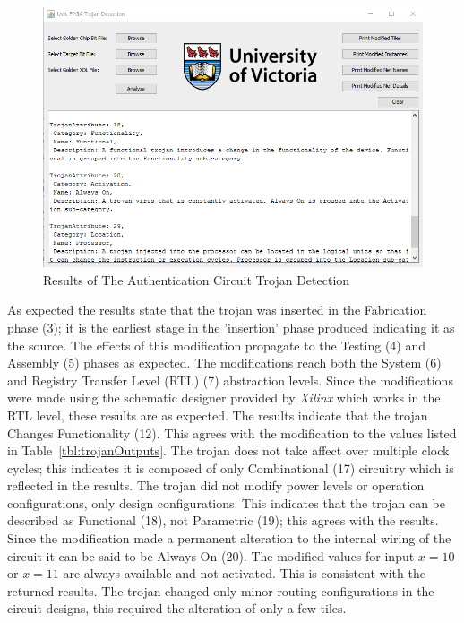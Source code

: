 \documentclass[journal, hidelinks]{IEEEtran}
\begin{document}
\begin{figure}[h]
	\centering
	\includegraphics[width=1\linewidth]{Figures/backDoorResult}
	\caption[Results of The Authentication Circuit Trojan Detection]{Results of The Authentication Circuit Trojan Detection}
	\label{fig:backDoorResult}
\end{figure}
As expected the results state that the trojan was inserted in the Fabrication phase (3); it is the earliest stage in the 'insertion' phase produced indicating it as the source.
The effects of this modification propagate to the Testing (4) and Assembly (5) phases as expected.
The modifications reach both the System (6) and Registry Transfer Level (RTL) (7) abstraction levels.
Since the modifications were made using the schematic designer provided by \textit{Xilinx} which works in the RTL level, these results are as expected.
The results indicate that the trojan Changes Functionality (12). 
This agrees with the modification to the values listed in Table~\ref{tbl:trojanOutputs}.
The trojan does not take affect over multiple clock cycles; this indicates it is composed of only Combinational (17) circuitry which is reflected in the results.
The trojan did not modify power levels or operation configurations, only design configurations.
This indicates that the trojan can be described as Functional (18), not Parametric (19); this agrees with the results.
Since the modification made a permanent alteration to the internal wiring of the circuit it can be said to be Always On (20).
The modified values for input $x=10$ or $x=11$ are always available and not activated.
This is consistent with the returned results.
The trojan changed only minor routing configurations in the circuit designs, this required the alteration of only a few tiles.
\end{document}
